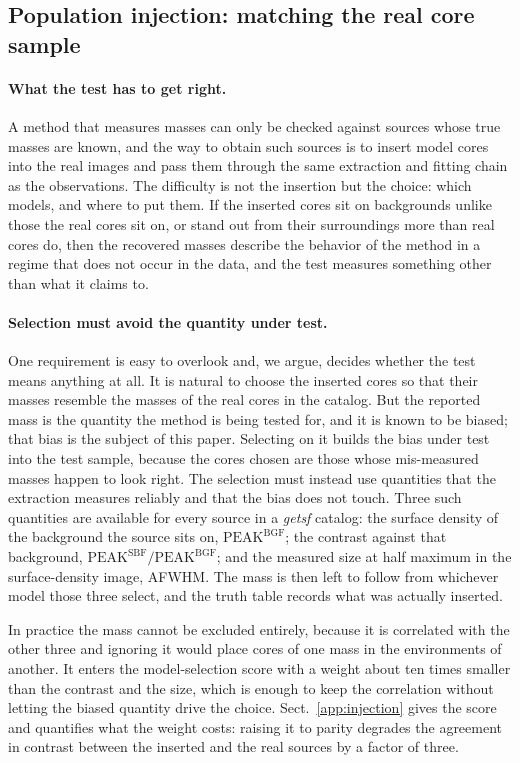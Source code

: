 \documentclass[11pt,a4paper]{article}
\begin{document}
\subsection{Population injection: matching the real core sample}
\label{sec:popinj}

\paragraph{What the test has to get right.}
A method that measures masses can only be checked against sources whose true
masses are known, and the way to obtain such sources is to insert model cores
into the real images and pass them through the same extraction and fitting
chain as the observations. The difficulty is not the insertion but the choice:
which models, and where to put them. If the inserted cores sit on backgrounds
unlike those the real cores sit on, or stand out from their surroundings more
than real cores do, then the recovered masses describe the behavior of the
method in a regime that does not occur in the data, and the test measures
something other than what it claims to.

\paragraph{Selection must avoid the quantity under test.}
One requirement is easy to overlook and, we argue, decides whether the test
means anything at all. It is natural to choose the inserted cores so that
their masses resemble the masses of the real cores in the catalog. But the
reported mass is the quantity the method is being tested for, and it is known
to be biased; that bias is the subject of this paper. Selecting on it builds
the bias under test into the test sample, because the cores chosen are those
whose mis-measured masses happen to look right. The selection must instead use
quantities that the extraction measures reliably and that the bias does not
touch. Three such quantities are available for every source in a \emph{getsf}
catalog: the surface density of the background the source sits on,
$\mathrm{PEAK^{BGF}}$; the contrast against that background,
$\mathrm{PEAK^{SBF}}/\mathrm{PEAK^{BGF}}$; and the measured size at half
maximum in the surface-density image, AFWHM. The mass is then left to follow
from whichever model those three select, and the truth table records what was
actually inserted.

In practice the mass cannot be excluded entirely, because it is correlated
with the other three and ignoring it would place cores of one mass in the
environments of another. It enters the model-selection score with a weight
about ten times smaller than the contrast and the size, which is enough to
keep the correlation without letting the biased quantity drive the choice.
Sect.~\ref{app:injection} gives the score and quantifies what the weight
costs: raising it to parity degrades the agreement in contrast between the
inserted and the real sources by a factor of three.
\end{document}
